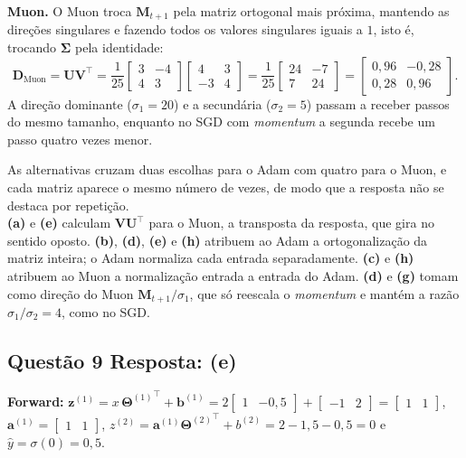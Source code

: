 \documentclass[11pt,a4paper]{article}
\begin{document}
\textbf{Muon.} O Muon troca $\mathbf{M}_{t+1}$ pela matriz ortogonal mais próxima, mantendo as direções singulares e fazendo todos os valores singulares iguais a $1$, isto é, trocando $\boldsymbol{\Sigma}$ pela identidade:
\[
\mathbf{D}_{\text{Muon}} = \mathbf{U}\mathbf{V}^{\top}
= \frac{1}{25}\begin{bmatrix} 3 & -4 \\ 4 & 3 \end{bmatrix}\begin{bmatrix} 4 & 3 \\ -3 & 4 \end{bmatrix}
= \frac{1}{25}\begin{bmatrix} 24 & -7 \\ 7 & 24 \end{bmatrix}
= \begin{bmatrix} 0{,}96 & -0{,}28 \\ 0{,}28 & 0{,}96 \end{bmatrix}.
\]
A direção dominante ($\sigma_1 = 20$) e a secundária ($\sigma_2 = 5$) passam a receber passos do mesmo tamanho, enquanto no SGD com \textit{momentum} a segunda recebe um passo quatro vezes menor.

As alternativas cruzam duas escolhas para o Adam com quatro para o Muon, e cada matriz aparece o mesmo número de vezes, de modo que a resposta não se destaca por repetição.\\
\textbf{(a)} e \textbf{(e)} calculam $\mathbf{V}\mathbf{U}^{\top}$ para o Muon, a transposta da resposta, que gira no sentido oposto.
\textbf{(b)}, \textbf{(d)}, \textbf{(e)} e \textbf{(h)} atribuem ao Adam a ortogonalização da matriz inteira; o Adam normaliza cada entrada separadamente.
\textbf{(c)} e \textbf{(h)} atribuem ao Muon a normalização entrada a entrada do Adam.
\textbf{(d)} e \textbf{(g)} tomam como direção do Muon $\mathbf{M}_{t+1}/\sigma_1$, que só reescala o \textit{momentum} e mantém a razão $\sigma_1/\sigma_2 = 4$, como no SGD.

\subsection*{Questão 9 \textemdash{} Resposta: (e)}
\textbf{Forward:} $\mathbf{z}^{(1)} = x\,{\mathbf{\Theta}^{(1)}}^{\top} + \mathbf{b}^{(1)} = 2\begin{bmatrix} 1 & -0{,}5 \end{bmatrix} + \begin{bmatrix} -1 & 2 \end{bmatrix} = \begin{bmatrix} 1 & 1 \end{bmatrix}$, $\mathbf{a}^{(1)} = \begin{bmatrix} 1 & 1 \end{bmatrix}$, $z^{(2)} = \mathbf{a}^{(1)}{\mathbf{\Theta}^{(2)}}^{\top} + b^{(2)} = 2 - 1{,}5 - 0{,}5 = 0$ e $\hat{y} = \sigma(0) = 0{,}5$.
\end{document}
